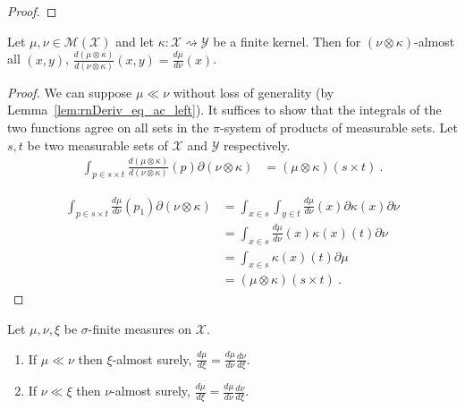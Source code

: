 \begin{proof} \leanok
{}
\end{proof}


\begin{lemma}
  \label{cor:rnDeriv_compProd_left}
  \leanok
  \uses{}
  Let $\mu, \nu \in \mathcal M(\mathcal X)$ and let $\kappa : \mathcal X \rightsquigarrow \mathcal Y$ be a finite kernel. Then for $(\nu \otimes \kappa)$-almost all $(x, y)$, $\frac{d (\mu \otimes \kappa)}{d (\nu \otimes \kappa)}(x,y) = \frac{d\mu}{d\nu}(x)$.
\end{lemma}

\begin{proof} \leanok
\uses{}
We can suppose $\mu \ll \nu$ without loss of generality (by Lemma~\ref{lem:rnDeriv_eq_ac_left}).
It suffices to show that the integrals of the two functions agree on all sets in the $\pi$-system of products of measurable sets. Let $s, t$ be two measurable sets of $\mathcal X$ and $\mathcal Y$ respectively.
\begin{align*}
\int_{p \in s \times t} \frac{d (\mu \otimes \kappa)}{d (\nu \otimes \kappa)}(p) \partial(\nu \otimes \kappa)
&= (\mu \otimes \kappa) (s \times t)
\: .
\end{align*}

\begin{align*}
\int_{p \in s \times t} \frac{d \mu}{d \nu}(p_1) \partial(\nu \otimes \kappa)
&= \int_{x \in s} \int_{y \in t} \frac{d \mu}{d \nu}(x) \partial \kappa(x) \partial \nu
\\
&= \int_{x \in s} \frac{d \mu}{d \nu}(x) \kappa(x)(t) \partial \nu
\\
&= \int_{x \in s} \kappa(x)(t) \partial \mu
\\
&= (\mu \otimes \kappa) (s \times t)
\: .
\end{align*}
\end{proof}


\begin{lemma}
  \label{lem:rnDeriv_chain}
  \leanok
  \uses{}
  Let $\mu, \nu, \xi$ be $\sigma$-finite measures on $\mathcal X$.
  \begin{enumerate}
    \item If $\mu \ll \nu$ then $\xi$-almost surely, $\frac{d \mu}{d \xi} = \frac{d \mu}{d \nu} \frac{d \nu}{d \xi}$.
    \item If $\nu \ll \xi$ then $\nu$-almost surely, $\frac{d \mu}{d \xi} = \frac{d \mu}{d \nu} \frac{d \nu}{d \xi}$.
  \end{enumerate}
\end{lemma}


